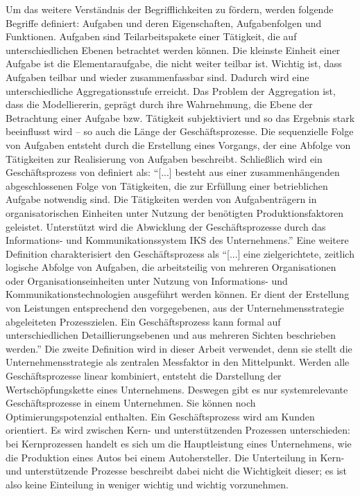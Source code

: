 Um das weitere Verständnis der Begrifflichkeiten zu fördern, werden folgende Begriffe definiert\autocite[vgl.][S.\,4-5]{staud_geschaftsprozessanalyse_2006}: Aufgaben und deren Eigenschaften, Aufgabenfolgen und Funktionen. Aufgaben sind Teilarbeitspakete einer Tätigkeit, die auf unterschiedlichen Ebenen betrachtet werden können. Die kleinste Einheit einer Aufgabe ist die Elementaraufgabe, die nicht weiter teilbar ist. Wichtig ist, dass Aufgaben teilbar und wieder zusammenfassbar sind. Dadurch wird eine unterschiedliche Aggregationsstufe erreicht. Das Problem der Aggregation ist, dass die Modelliererin, geprägt durch ihre Wahrnehmung, die Ebene der Betrachtung einer Aufgabe bzw. Tätigkeit subjektiviert und so das Ergebnis stark beeinflusst wird -- so auch die Länge der Geschäftsprozesse. Die sequenzielle Folge von Aufgaben entsteht durch die Erstellung eines Vorgangs, der eine Abfolge von Tätigkeiten zur Realisierung von Aufgaben beschreibt. Schließlich wird ein Geschäftsprozess von \cite{staud_geschaftsprozessanalyse_2006} definiert als: \enquote{[...] besteht aus einer zusammenhängenden abgeschlossenen Folge von Tätigkeiten, die zur Erfüllung einer betrieblichen Aufgabe notwendig sind. Die Tätigkeiten werden von Aufgabenträgern in organisatorischen Einheiten unter Nutzung der benötigten Produktionsfaktoren geleistet. Unterstützt wird die Abwicklung der Geschäftsprozesse durch das Informations- und Kommunikationssystem IKS des Unternehmens.}\autocite[][S.\,9]{staud_geschaftsprozessanalyse_2006} Eine weitere Definition charakterisiert den Geschäftsprozess als \enquote{[...] eine zielgerichtete, zeitlich logische Abfolge von Aufgaben, die arbeitsteilig von mehreren Organisationen oder Organisationseinheiten unter Nutzung von Informations- und Kommunikationstechnologien ausgeführt werden können. Er dient der Erstellung von Leistungen entsprechend den vorgegebenen, aus der Unternehmensstrategie abgeleiteten Prozesszielen. Ein Geschäftsprozess kann formal auf unterschiedlichen Detaillierungsebenen und aus mehreren Sichten beschrieben werden.}\autocite[][S.\,41]{gadatsch_grundkurs_2010} Die zweite Definition wird in dieser Arbeit verwendet, denn sie stellt die Unternehmensstrategie als zentralen Messfaktor in den Mittelpunkt. Werden alle Geschäftsprozesse linear kombiniert, entsteht die Darstellung der Wertschöpfungskette eines Unternehmens. Deswegen gibt es nur systemrelevante Geschäftsprozesse in einem Unternehmen. Sie können noch Optimierungspotenzial enthalten. Ein Geschäftsprozess wird am Kunden orientiert. Es wird zwischen Kern- und unterstützenden Prozessen unterschieden: bei Kernprozessen handelt es sich um die Hauptleistung eines Unternehmens, wie die Produktion eines Autos bei einem Autohersteller. Die Unterteilung in Kern- und unterstützende Prozesse beschreibt dabei nicht die Wichtigkeit dieser; es ist also keine Einteilung in weniger wichtig und wichtig vorzunehmen.\autocite[vgl.][S.\,11]{staud_geschaftsprozessanalyse_2006} \par


